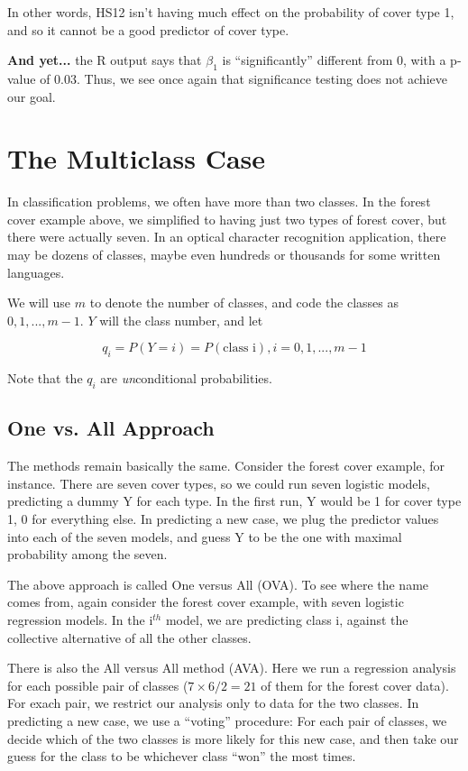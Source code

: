 In other words, HS12 isn't having much effect on the probability of
cover type 1, and so it cannot be a good predictor of cover type.  

{\bf And yet...} the R output says that $\beta_1$ is ``significantly''
different from 0, with a p-value of 0.03.  Thus, we see once again that
significance testing does not achieve our goal.  

\section{The Multiclass Case} 
\label{multiclass}

In classification problems, we often have more than two classes.  In the
forest cover example above, we simplified to having just two types of
forest cover, but there were actually seven.  In an optical character
recognition application, there may be dozens of classes, maybe even
hundreds or thousands for some written languages.

We will use $m$ to denote the number of classes, and code the classes as
$0,1,...,m-1$.  $Y$ will the class number, and let

\begin{equation}
q_i = P(Y = i) = P(\textrm{class i}), i = 0,1,...,m-1
\end{equation}

Note that the $q_i$ are {\it un}conditional probabilities.

\subsection{One vs. All Approach}

The methods remain basically the same.  Consider the forest cover
example, for instance.  There are seven cover types, so we could run
seven logistic models, predicting a dummy Y for each type.  In the first
run, Y would be 1 for cover type 1, 0 for everything else.  In
predicting a new case, we plug the predictor values into each of the
seven models, and guess Y to be the one with maximal probability among
the seven.

The above approach is called One versus All (OVA).  To see where the name
comes from, again consider the forest cover example, with seven logistic
regression models.  In the i$^{th}$ model, we are predicting class i,
against the collective alternative of all the other classes.  

There is also the All versus All method (AVA). Here we run a regression
analysis for each possible pair of classes ($7 \times 6 / 2 = 21$ of
them for the forest cover data).  For exach pair, we restrict our
analysis only to data for the two classes.  In predicting a new case, we
use a ``voting'' procedure:  For each pair of classes, we decide which
of the two classes is more likely for this new case, and then take our
guess for the class to be whichever class ``won'' the most times.

